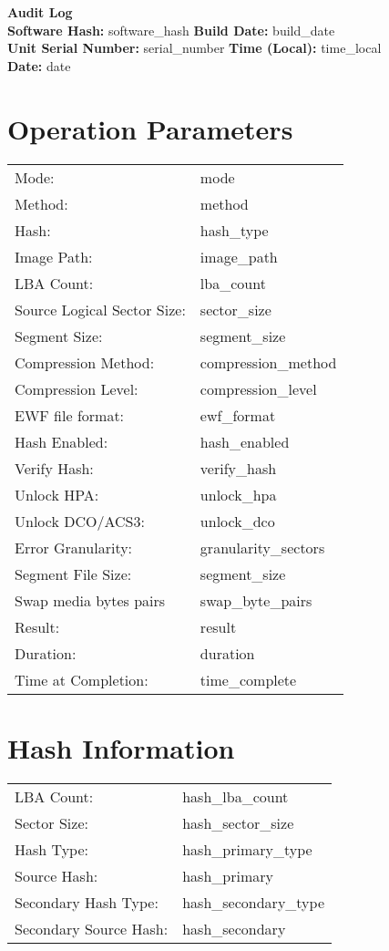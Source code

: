 \documentclass[a4paper,10pt]{article}
\begin{document}
\small

{\LARGE\textbf{Audit Log}}\\[1em]

\textbf{Software Hash:} {{ software_hash }} \hfill \textbf{Build Date:} {{ build_date }}\\
\textbf{Unit Serial Number:} {{ serial_number }} \hfill \textbf{Time (Local):} {{ time_local }}\\
\textbf{Date:} {{ date }}

\vspace{1em}
\section*{Operation Parameters}
\begin{tabular}{@{}ll}
Mode: & {{ mode }} \\
Method: & {{ method }} \\
Hash: & {{ hash_type }} \\
Image Path: & {{ image_path }} \\
LBA Count: & {{ lba_count }} \\
Source Logical Sector Size: & {{ sector_size }} \\
Segment Size: & {{ segment_size }} \\
Compression Method: & {{ compression_method }} \\
Compression Level: & {{ compression_level }} \\
EWF file format: & {{ ewf_format }} \\
Hash Enabled: & {{ hash_enabled }} \\
Verify Hash: & {{ verify_hash }} \\
Unlock HPA: & {{ unlock_hpa }} \\
Unlock DCO/ACS3: & {{ unlock_dco }} \\
Error Granularity: & {{ granularity_sectors }} \\
Segment File Size: & {{ segment_size }} \\
Swap media bytes pairs & {{ swap_byte_pairs }} \\
Result: & {{ result }} \\
Duration: & {{ duration }} \\
Time at Completion: & {{ time_complete }} \\
\end{tabular}

\vspace{1em}
\section*{Hash Information}
\begin{tabular}{@{}ll}
LBA Count: & {{ hash_lba_count }} \\
Sector Size: & {{ hash_sector_size }} \\
Hash Type: & {{ hash_primary_type }} \\
Source Hash: & {{ hash_primary }} \\
Secondary Hash Type: & {{ hash_secondary_type }} \\
Secondary Source Hash: & {{ hash_secondary }} \\
\end{tabular}
\end{document}
